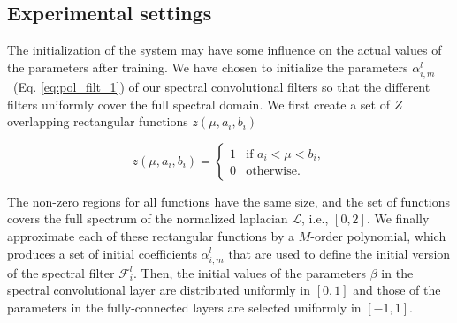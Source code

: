 \documentclass[10pt,journal,compsoc]{IEEEtran}
\begin{document}
\begin{table*}[!ht]
{			%
		}
		\label{tab:arch_part2}
	\end{table*}

	\subsection{Experimental settings}
	\label{s:init}

	The initialization of the system may have some influence on the actual values of the parameters after training. We have chosen to initialize the parameters $\alpha_{i,m}^l$~(Eq. \ref{eq:pol_filt_1}) of our spectral convolutional filters so that the different filters uniformly cover the full spectral domain. We first create a set of $Z$ overlapping rectangular functions $z(\mu, a_i, b_i)$

	\begin{equation}
	z(\mu, a_i, b_i) =
	\begin{cases}
	1 & \mbox{if } a_i < \mu < b_i, \\
	0 & \mbox{otherwise.}
	\end{cases}
	\end{equation}

	The non-zero regions for all functions have the same size, and the set of functions covers the full spectrum of the normalized laplacian $\mathcal{L}$, i.e., $[0, 2]$. We finally approximate each of these rectangular functions by a $M$-order polynomial, which produces a set of initial coefficients $\alpha_{i,m}^l$ that are used to define the initial version of the spectral filter $\mathcal{F}_i^{l}$. Then, the initial values of the parameters $\beta$ in the spectral convolutional layer are distributed uniformly in $[0, 1]$ and those of the parameters in the fully-connected layers are selected uniformly in $[-1, 1]$.
\end{document}
